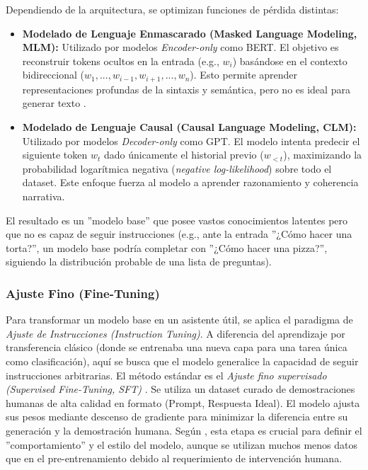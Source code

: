 \documentclass[11pt, a4paper]{article}
\begin{document}
Dependiendo de la arquitectura, se optimizan funciones de pérdida distintas:
\begin{itemize}
    \item \textbf{Modelado de Lenguaje Enmascarado (Masked Language Modeling, MLM):} Utilizado por modelos \textit{Encoder-only} como BERT. El objetivo es reconstruir tokens ocultos en la entrada (e.g., $w_i$)
    basándose en el contexto bidireccional ($w_{1}, ..., w_{i-1}, w_{i+1}, ..., w_n$). Esto permite aprender representaciones profundas de la sintaxis y semántica, pero no es ideal para generar texto 
    \cite{devlin_bert_nodate}.
    \item \textbf{Modelado de Lenguaje Causal (Causal Language Modeling, CLM):} Utilizado por modelos \textit{Decoder-only} como GPT. El modelo intenta predecir el siguiente token $w_t$ dado únicamente el 
    historial previo ($w_{<t}$), maximizando la probabilidad logarítmica negativa (\textit{negative log-likelihood}) sobre todo el dataset. Este enfoque fuerza al modelo a aprender razonamiento y coherencia 
    narrativa.
\end{itemize}

El resultado es un ''modelo base'' que posee vastos conocimientos latentes pero que no es capaz de seguir instrucciones (e.g., ante la entrada ''¿Cómo hacer una torta?'', un modelo base podría completar con 
''¿Cómo hacer una pizza?'', siguiendo la distribución probable de una lista de preguntas).

\subsubsection{Ajuste Fino (Fine-Tuning)}
Para transformar un modelo base en un asistente útil, se aplica el paradigma de \textit{Ajuste de Instrucciones (Instruction Tuning)}. A diferencia del aprendizaje por transferencia clásico (donde se entrenaba
una nueva capa para una tarea única como clasificación), aquí se busca que el modelo generalice la capacidad de seguir instrucciones arbitrarias. El método estándar es el \textit{Ajuste fino supervisado 
(Supervised Fine-Tuning, SFT)} . Se utiliza un dataset curado de demostraciones humanas de alta calidad en formato (Prompt, Respuesta Ideal). El modelo ajusta sus pesos mediante descenso de gradiente para 
minimizar la diferencia entre su generación y la demostración humana. Según \cite{ouyang_training_nodate}, esta etapa es crucial para definir el ''comportamiento'' y el estilo del modelo, aunque se utilizan
muchos menos datos que en el pre-entrenamiento debido al requerimiento de intervención humana.
\end{document}
